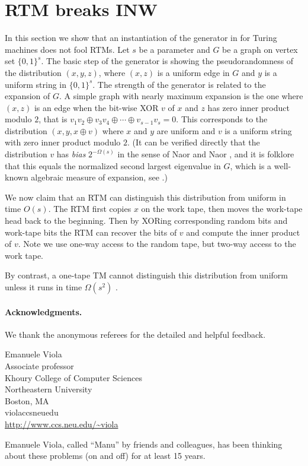 \documentclass{toc}
\newcommand{\zo}{\{0, 1\}}
\begin{document}
\section{RTM breaks INW \label{sec:RTM-breaks-INW}}

In this section we show that an instantiation of the generator in
\cite{INW94} for Turing machines does not fool RTMs. Let $s$ be
a parameter and $G$ be a graph on vertex set $\zo^{s}$. The basic
step of the \cite{INW94} generator is showing the pseudorandomness
of the distribution $(x,y,z)$, where $(x,z)$ is a uniform edge in
$G$ and $y$ is a uniform string in $\zo^{s}$. The strength of the
generator is related to the expansion of $G$. A simple graph with
nearly maximum expansion is the one where $(x,z)$ is an edge when
the bit-wise XOR $v$ of $x$ and $z$ has zero inner product modulo
$2$, that is $v_{1}v_{2}\oplus v_{3}v_{4}\oplus\cdots\oplus v_{s-1}v_{s}=0$.
This corresponds to the distribution $(x,y,x\oplus v)$ where $x$
and $y$ are uniform and $v$ is a uniform string with zero inner
product modulo $2$. (It can be verified directly that the distribution
$v$ has \emph{bias} $2^{-\Omega(s)}$ in the sense of Naor and Naor
\cite{NaN93}, and it is folklore that this equals the normalized
second largest eigenvalue in $G$, which is a well-known algebraic
measure of expansion, see \cite{HooryLW06}.)

We now claim that an RTM can distinguish this distribution from uniform
in time $O(s)$. The RTM first copies $x$ on the work tape, then
moves the work-tape head back to the beginning. Then by XORing corresponding
random bits and work-tape bits the RTM can recover the bits of $v$
and compute the inner product of $v$. Note we use one-way access
to the random tape, but two-way access to the work tape.

By contrast, a one-tape TM cannot distinguish this distribution from
uniform unless it runs in time $\Omega(s^{2})$ \cite{INW94}.

\paragraph{Acknowledgments.}

We thank the anonymous referees for the detailed and helpful feedback.


%
%


\begin{tocauthors}
\begin{tocinfo}[viola]
 Emanuele Viola\\
 Associate professor \\
 Khoury College of Computer Sciences\\
 Northeastern University\\
 Boston, MA\\
 viola\tocat{}ccs\tocdot{}neu\tocdot{}edu \\
 \url{http://www.ccs.neu.edu/~viola}
\end{tocinfo}

\end{tocauthors}

\begin{tocaboutauthors}
\begin{tocabout}[viola]
{\sc Emanuele Viola}, called ``Manu'' by friends and colleagues,
has been thinking about these problems (on and off) for at least 15 years.
\end{tocabout}
\end{tocaboutauthors}
\end{document}
